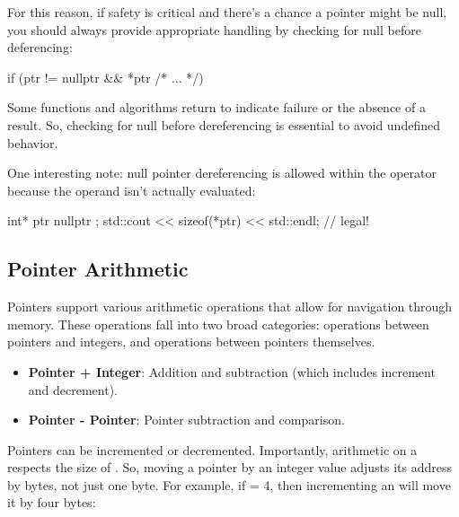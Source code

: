 \documentclass[12pt]{article}
\begin{document}
\noindent
For this reason, if safety is critical and there's a chance a pointer might be null, you should always provide appropriate handling by checking for null before deferencing:

\begin{cxx}{}
if (ptr != nullptr && *ptr /* ... */)
\end{cxx}

\noindent
Some functions and algorithms return  to indicate failure or the absence of a result.
So, checking for null before dereferencing is essential to avoid undefined behavior.

\vspace{1em}
\noindent
One interesting note: null pointer dereferencing is allowed within the  operator because the operand isn't actually evaluated:

\begin{cxx}{}
int* ptr { nullptr };
std::cout << sizeof(*ptr) << std::endl; // legal!
\end{cxx}

\subsection{Pointer Arithmetic}

Pointers support various arithmetic operations that allow for navigation through memory.
These operations fall into two broad categories: operations between pointers and integers, and operations between pointers themselves.

\begin{itemize}

	\item \textbf{Pointer + Integer}: Addition and subtraction (which includes increment and decrement).
	\item \textbf{Pointer - Pointer}: Pointer subtraction and comparison.

\end{itemize}

\noindent
Pointers can be incremented or decremented.
Importantly, arithmetic on a  respects the size of .
So, moving a pointer by an integer value adjusts its address by  bytes, not just one byte.
For example, if  = 4, then incrementing an  will move it by four bytes:
\end{document}
